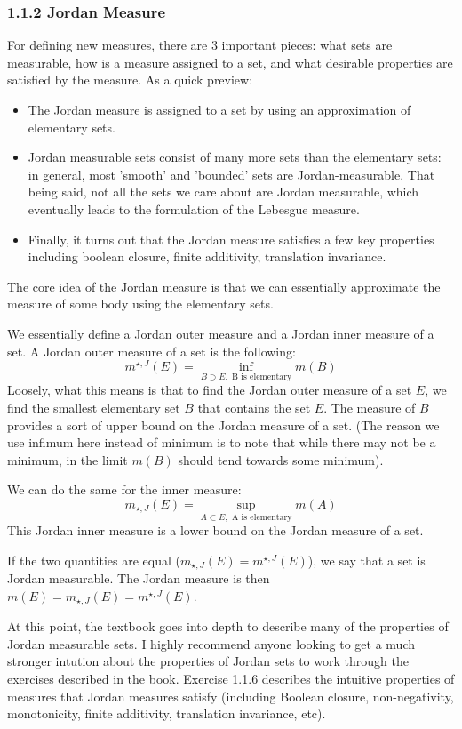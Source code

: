 \documentclass[answers,12pt]{exam}
\begin{document}
\subsubsection{1.1.2 Jordan Measure}
For defining new measures, there are 3 important pieces: what sets are measurable, how is a measure assigned to a set, and what desirable properties are satisfied by the measure.
As a quick preview:
\begin{itemize}
    \item The Jordan measure is assigned to a set by using an approximation of elementary sets.
    \item Jordan measurable sets consist of many more sets than the elementary sets: 
    in general, most 'smooth' and 'bounded' sets are Jordan-measurable.
    That being said, not all the sets we care about are Jordan measurable, which eventually leads to the formulation of the Lebesgue measure.
    \item Finally, it turns out that the Jordan measure satisfies a few key properties including boolean closure, finite additivity, translation invariance.

\end{itemize}
The core idea of the Jordan measure is that we can essentially approximate the measure of some body using the elementary sets.

We essentially define a Jordan outer measure and a Jordan inner measure of a set.
A Jordan outer measure of a set is the following: 
\[
    m^{\star, J}(E) = \inf_{B \supset E, \text{ B is elementary}} m(B)
\]
Loosely, what this means is that to find the Jordan outer measure of a set $E$, we find the smallest elementary set $B$ that contains the set $E$.
The measure of $B$ provides a sort of upper bound on the Jordan measure of a set.
(The reason we use infimum here instead of minimum is to note that while there may not be a minimum, in the limit $m(B)$ should tend towards some minimum).

We can do the same for the inner measure:
\[
    m_{\star, J}(E) = \sup_{A \subset E, \text{ A is elementary}} m(A)
\]
This Jordan inner measure is a lower bound on the Jordan measure of a set.

If the two quantities are equal ($m_{\star, J}(E) = m^{\star, J}(E)$), we say that a set is Jordan measurable.
The Jordan measure is then $m(E) = m_{\star, J}(E) = m^{\star, J}(E)$.

At this point, the textbook goes into depth to describe many of the properties of Jordan measurable sets.
I highly recommend anyone looking to get a much stronger intution about the properties of Jordan sets to work through the exercises described in the book.
Exercise 1.1.6 describes the intuitive properties of measures that Jordan measures satisfy (including Boolean closure, non-negativity, monotonicity, finite additivity, translation invariance, etc).
\end{document}
